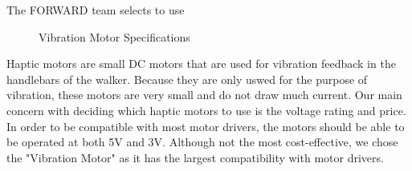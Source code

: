 \noindent The FORWARD team selects to use \\

\begin{figure}[H]
	\centering
	\setlength{\tabcolsep}{5pt} %
	\renewcommand{\arraystretch}{1.75} %
	\caption{\label{fig:vibrationMotorSpecifications}Vibration Motor Specifications}
\end{figure}

\noindent Haptic motors are small DC motors that are used for vibration feedback in the handlebars of the walker. Because they are only uswed for the purpose of vibration, these motors are very small and do not draw much current. Our main concern with deciding which haptic motors to use is the voltage rating and price. In order to be compatible with most motor drivers, the motors should be able to be operated at both 5V and 3V. Although not the most cost-effective, we chose the "Vibration Motor" as it has the largest compatibility with motor drivers.\\

